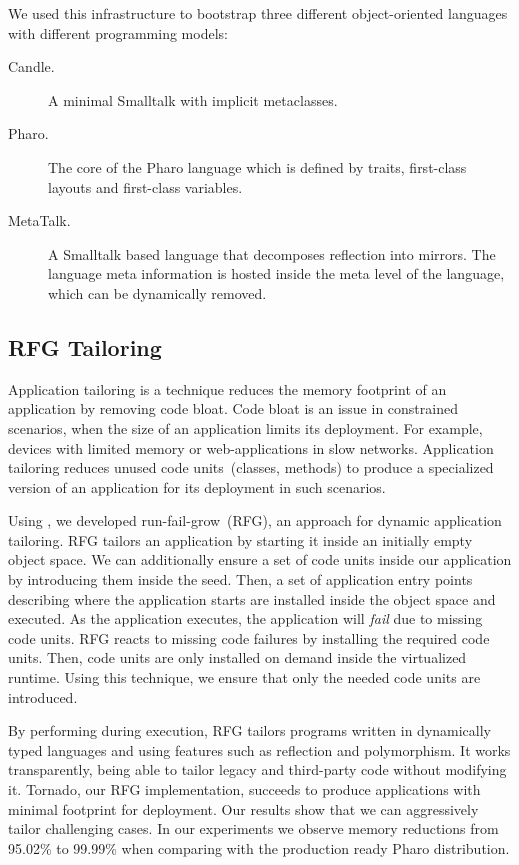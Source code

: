We used this infrastructure to bootstrap three different object-oriented languages with different programming models: 
\begin{description}
\item[Candle.] A minimal Smalltalk with implicit metaclasses.
\item[Pharo.] The core of the Pharo language which is defined by traits, first-class layouts and first-class variables.
\item[MetaTalk.] A Smalltalk based language that decomposes reflection into mirrors. The language meta information is hosted inside the meta level of the language, which can be dynamically removed.
\end{description}

\subsection{RFG Tailoring} 

Application tailoring is a technique reduces the memory footprint of an application by removing code bloat. Code bloat is an issue in constrained scenarios, when the size of an application limits its deployment. For example, devices with limited memory or web-applications in slow networks. Application tailoring reduces unused code units~(\eg classes, methods) to produce a specialized version of an application for its deployment in such scenarios.

Using \Vtt, we developed run-fail-grow~(RFG), an approach for dynamic application tailoring. RFG tailors an application by starting it inside an initially empty object space. We can additionally ensure a set of code units inside our application by introducing them inside the seed. Then, a set of application entry points describing where the application starts are installed inside the object space and executed. As the application executes, the application will \emph{fail} due to missing code units. RFG reacts to missing code failures by installing the required code units. Then, code units are only installed on demand inside the virtualized runtime. Using this technique, we ensure that only the needed code units are introduced.

By performing during execution, RFG tailors programs written in dynamically typed languages and using features such as reflection and polymorphism. It works transparently, being able to tailor legacy and third-party code without modifying it. Tornado, our RFG implementation, succeeds to produce applications with minimal footprint for deployment. Our results show that we can aggressively tailor challenging cases. In our experiments we observe memory reductions from 95.02\% to 99.99\% when comparing with the production ready Pharo distribution.

